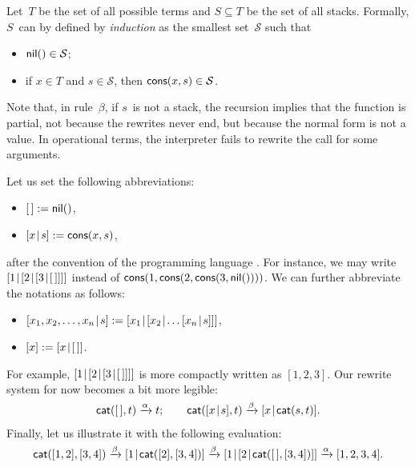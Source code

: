 Let~\(T\) be the set of all possible terms and \(S \subseteq T\) be
the set of all stacks. Formally, \(S\)~can by defined by
\emph{induction} as the smallest set~\(\mathcal{S}\) such
that
\begin{itemize}

  \item \(\textsf{nil}() \in \mathcal{S}\);\label{def:stack}

  \item if \(x \in T\) and \(s \in \mathcal{S}\), then
    \(\textsf{cons}(x,s) \in \mathcal{S}\).

\end{itemize}

Note that, in rule~\(\beta\), if \(s\)~is not a stack, the recursion
implies that the function  is partial, not because the
rewrites never end, but because the normal form is not a value. In operational terms, the
interpreter fails to rewrite the call for some arguments.

Let us set the following abbreviations:
\begin{itemize}

  \item \([\,] := \textsf{nil}()\),

  \item \([{x}\!\mid\!{s}] := \textsf{cons}(x,s)\),

\end{itemize}
after the convention of the programming language \Prolog
\citep{SterlingShapiro_1994,Bratko_2000}. For instance, we may write
\([{1}\!\mid\!{[{2}\!\mid\!{[{3}\!\mid\!{[\,]}]}]}]\) instead of
\(\textsf{cons}(1,\textsf{cons}(2,\textsf{cons}(3,\textsf{nil}())))\).  We can
further abbreviate the notations as follows:
\begin{itemize}

  \item \(\cons{x_1,x_2,\dots,x_n}{s} := \cons{x_1}{\cons{x_2}{\dots
      \cons{x_n}{s}}}\),

  \item \([x] := [{x}\!\mid\!{[\,]}]\).

\end{itemize}
For example, \([{1}\!\mid\!{[{2}\!\mid\!{[{3}\!\mid\!{[\,]}]}]}]\) is more compactly
written as \([1,2,3]\). Our rewrite system for
 now becomes a bit more legible:
\begin{equation}
\fun{cat}(        \el,t) \xrightarrow{\smash{\alpha}} t;\qquad
\fun{cat}(\cons{x}{s},t) \xrightarrow{\smash{\beta}}
\cons{x}{\fun{cat}(s,t)}.
\label{def:cat}\index{stack!concatenation!definition}
\end{equation}
Finally, let us illustrate it with the following
evaluation:
\begin{equation*}
\textsf{cat}([1,2],[3,4])
\xrightarrow{\smash{\beta}}
[{1}\!\mid\!{\textsf{cat}([2],[3,4])}]
\xrightarrow{\smash{\beta}}
[{1}\!\mid\!{[{2}\!\mid\!{\textsf{cat}([\,],[3,4])}]}]
\xrightarrow{\smash{\alpha}}
[1,2,3,4].
\end{equation*}

